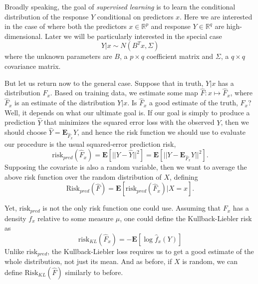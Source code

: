 \documentclass[12pt]{article}
\begin{document}
\maketitle

\newcommand{\tr}{\text{tr}}
\newcommand{\E}{\textbf{E}}
\newcommand{\diag}{\text{diag}}
\newcommand{\argmax}{\text{argmax}}
\newcommand{\Cov}{\text{Cov}}
\newcommand{\Var}{\text{Var}}
\newcommand{\argmin}{\text{argmin}}
\newcommand{\Vol}{\text{Vol}}
\newcommand{\comm}[1]{}

Broadly speaking, the goal of \emph{supervised learning} is to learn
the conditional distribution of the response $Y$ conditional on
predictors $x$.  Here we are interested in the case of where both the
predictors $x \in \mathbb{R}^p$ and response $Y \in \mathbb{R}^q$ are
high-dimensional.  Later we will be particularly interested in the
special case
$$
Y|x \sim N(B^T x, \Sigma)
$$
where the unknown parameters are $B$, a $p \times q$ coefficient
matrix and $\Sigma$, a $q \times q$ covariance matrix.

But let us return now to the general case.  Suppose that in truth,
$Y|x$ has a distribution $F_x$.  Based on training data, we estimate
some map $\hat{F}: x \mapsto \hat{F}_x$, where $\hat{F}_x$ is an
estimate of the distribution $Y|x$.  Is $\hat{F}_x$ a good estimate of
the truth, $F_x$? Well, it depends on what our ultimate goal is.  If
our goal is simply to produce a prediction $\hat{Y}$ that minimizes
the squared error loss with the observed $Y$, then we should choose
$\hat{Y} = \E_{\hat{F}_x} Y$, and hence the risk function we should
use to evaluate our procedure is the usual squared-error prediction
risk,
\[
\text{risk}_{pred}(\hat{F}_x) = \E[||Y - \hat{Y}||^2] = \E[||Y - \E_{\hat{F}_x} Y||^2].
\]
Supposing the covariate is also a random variable, then we want to
average the above risk function over the random distribution of $X$,
defining
\[
\text{Risk}_{pred}(\hat{F}) = \E[\text{risk}_{pred}(\hat{F}_x)|X = x].
\]

Yet, $\text{risk}_{pred}$ is not the only risk function one could use.
Assuming that $F_x$ has a density $f_x$ relative to some measure $\mu$, one
could define the Kullback-Liebler risk as
\[
\text{risk}_{KL}(\hat{F}_x) = -\E[\log \hat{f}_x(Y)]
\]
Unlike $\text{risk}_{pred}$, the Kullback-Liebler loss requires us to
get a good estimate of the whole distribution, not just its mean.  And
as before, if $X$ is random, we can define
$\text{Risk}_{KL}(\hat{F})$ similarly to before.
\end{document}

